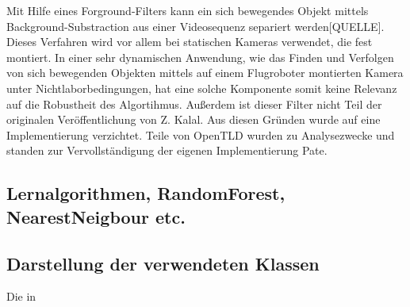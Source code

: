 Mit Hilfe eines Forground-Filters kann ein sich bewegendes Objekt mittels Background-Substraction aus einer Videosequenz separiert werden{[}QUELLE{]}. Dieses Verfahren wird vor allem bei statischen Kameras verwendet, die fest montiert. In einer sehr dynamischen Anwendung, wie das Finden und Verfolgen von sich bewegenden Objekten mittels auf einem Flugroboter montierten Kamera unter Nichtlaborbedingungen, hat eine solche Komponente somit keine Relevanz auf die Robustheit des Algortihmus. Außerdem ist dieser Filter nicht Teil der originalen Veröffentlichung von Z. Kalal. Aus diesen Gründen wurde auf eine Implementierung verzichtet. Teile von OpenTLD wurden zu Analysezwecke und standen zur Vervollständigung der eigenen Implementierung Pate.

\subsection*{Lernalgorithmen, RandomForest, NearestNeigbour etc.}

\subsection*{Darstellung der verwendeten Klassen}
Die in 

